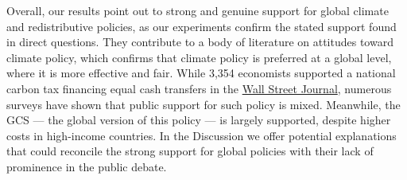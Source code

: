 Overall, our results %
point out to strong and genuine support for global climate and redistributive policies, as our experiments confirm the stated support found in direct questions. 
They contribute to a body of literature on attitudes toward climate policy, which confirms that climate policy is preferred at a global level,\citep{issp_international_2010,beiser-mcgrath_could_2019,sivonen_attitudes_2022,meilland_international_2024} where it is more effective and fair. 
While 3,354 economists supported a national carbon tax financing equal cash transfers in the \href{https://www.clcouncil.org/media/EconomistsStatement.pdf}{Wall Street Journal}, numerous surveys have shown that public support for such policy is mixed.\citep{douenne_yellow_2022,dechezlepretre_fighting_nodate,carattini_overcoming_2018,maestre-andres_perceived_2019,mildenberger_limited_2022,sommer_supporting_2022} Meanwhile, the GCS --- the global version of this policy --- is largely supported, despite higher costs in high-income countries. 
In the Discussion we offer potential explanations that could reconcile the strong support for global policies with their lack of prominence in the public debate. %



